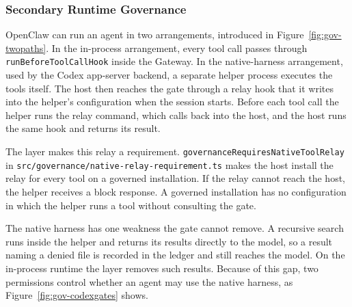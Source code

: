 \subsubsection{Secondary Runtime Governance}
\label{sec:gov-secondary-runtime}

OpenClaw can run an agent in two arrangements, introduced in
Figure~\ref{fig:gov-twopaths}. In the in-process arrangement, every tool
call passes through \texttt{runBeforeToolCallHook} inside the Gateway. In
the native-harness arrangement, used by the Codex app-server backend, a
separate helper process executes the tools itself. The host then reaches
the gate through a relay hook that it writes into the helper's
configuration when the session starts. Before each tool call the helper
runs the relay command, which calls back into the host, and the host runs
the same hook and returns its result.

The layer makes this relay a requirement. \texttt{governanceRequiresNativeToolRelay}
in \texttt{src/governance/native-relay-requirement.ts} makes the host
install the relay for every tool on a governed installation. If the relay
cannot reach the host, the helper receives a block response. A governed
installation has no configuration in which the helper runs a tool without
consulting the gate.

The native harness has one weakness the gate cannot remove. A recursive
search runs inside the helper and returns its results directly to the
model, so a result naming a denied file is recorded in the ledger and still
reaches the model. On the in-process runtime the layer removes such
results. Because of this gap, two permissions control whether an agent may
use the native harness, as Figure~\ref{fig:gov-codexgates} shows.

